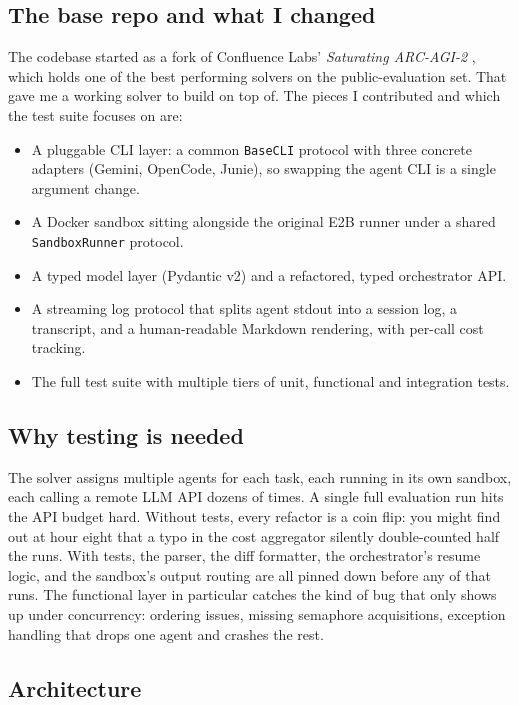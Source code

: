 \documentclass[11pt,a4paper]{article}
\begin{document}
\subsection{The base repo and what I changed}

The codebase started as a fork of Confluence Labs' \emph{Saturating ARC-AGI-2} \cite{baserepo}, which holds one of the best performing solvers on the public-evaluation set. That gave me a working solver to build on top of. The pieces I contributed and which the test suite focuses on are:

\begin{itemize}
  \item A pluggable CLI layer: a common \texttt{BaseCLI} protocol with three concrete adapters (Gemini, OpenCode, Junie), so swapping the agent CLI is a single argument change.
  \item A Docker sandbox sitting alongside the original E2B runner under a shared \texttt{SandboxRunner} protocol.
  \item A typed model layer (Pydantic v2) and a refactored, typed orchestrator API.
  \item A streaming log protocol that splits agent stdout into a session log, a transcript, and a human-readable Markdown rendering, with per-call cost tracking.
  \item The full test suite with multiple tiers of unit, functional and integration tests.
\end{itemize}

\subsection{Why testing is needed}

The solver assigns multiple agents for each task, each running in its own sandbox, each calling a remote LLM API dozens of times. A single full evaluation run hits the API budget hard. Without tests, every refactor is a coin flip: you might find out at hour eight that a typo in the cost aggregator silently double-counted half the runs. With tests, the parser, the diff formatter, the orchestrator's resume logic, and the sandbox's output routing are all pinned down before any of that runs. The functional layer in particular catches the kind of bug that only shows up under concurrency: ordering issues, missing semaphore acquisitions, exception handling that drops one agent and crashes the rest.

\subsection{Architecture}
\end{document}

